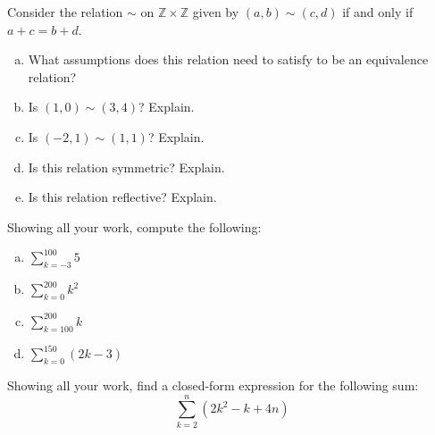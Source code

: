 \documentclass[11pt,letterpaper]{article}
\begin{document}

 Consider the relation $\sim$ on $\mathbb{Z} \times \mathbb{Z}$ given by $(a, b) \sim (c, d)$ if and only if $a + c= b + d$.
	\begin{enumerate}[(a)]
	\item What assumptions does this relation need to satisfy to be an equivalence relation? 
	\item Is $(1, 0) \sim (3,4)$? Explain. 
	\item Is $(-2, 1) \sim (1, 1)$? Explain. 
	\item Is this relation symmetric? Explain. 
	\item Is this relation reflective? Explain. 
	\end{enumerate}



\newpage



 Showing all your work, compute the following:
	\begin{enumerate}[(a)]
	\item $\displaystyle \sum_{k= -3}^{100} 5$
	\item $\displaystyle \sum_{k=0}^{200} k^2$
	\item $\displaystyle \sum_{k=100}^{200} k$
	\item $\displaystyle \sum_{k=0}^{150} (2k - 3)$
	\end{enumerate}



\newpage



 Showing all your work, find a closed-form expression for the following sum:
	\[
	\sum_{k=2}^n (2k^2 - k + 4n)
	\]
\end{document}
